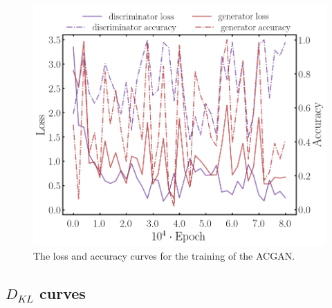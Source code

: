 \documentclass[twocolumn]{article}
\numberwithin{equation}{section}
\begin{document}

\begin{figure}[!ht]%
\includegraphics[width=\columnwidth]{figures/graphs/metrics1.png}
\centering
\caption{The loss and accuracy curves for the training of the ACGAN.}
\label{fig:acgan_losscurve}
\end{figure}

\subsection{$D_{KL}$ curves}
\end{document}
